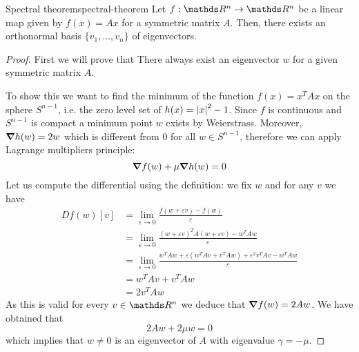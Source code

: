 \documentclass[12pt]{extarticle}
\numberwithin{equation}{subsection}
\begin{document}
\begin{corollary}{Spectral theorem}{spectral-theorem}
	Let $f: \R^n \to \R^n$ be a linear map given by $f(x) = Ax$ for a symmetric matrix $A$.
	Then, there exists an orthonormal basis $\{v_1, \dots, v_n \}$ of eigenvectors.
\end{corollary}
\begin{proof}
	First we will prove that There always exist an eigenvector $w$ for a given symmetric matrix $A$.

	To show this we want to find the minimum of the function $f(x) = x^T A x$ on the sphere $S^{n-1}$,
	i.e. the zero level set of $h(x) = \abs{x}^2 - 1$.
	Since $f$ is continuous and $S^{n-1}$ is compact a minimum point $w$ exists by Weierstrass.
	Moreover, $\grad h(w) = 2w$ which is different from $0$ for all $w \in S^{n-1}$, therefore we can
	apply Lagrange multipliers principle:
	\begin{equation}
		\grad f(w) + \mu \grad h(w) = 0
	\end{equation}
	Let us compute the differential using the definition: we fix $w$ and for any $v$ we have
	\begin{align}
		Df(w)[v] & = \lim_{\varepsilon \to 0} \frac{f(w + \varepsilon v) - f(w)}{\varepsilon}                                                 \\
		         & = \lim_{\varepsilon \to 0} \frac{(w + \varepsilon v)^T A (w + \varepsilon v) - w^T A w}{\varepsilon}                       \\
		         & = \lim_{\varepsilon \to 0} \frac{w^T A w + \varepsilon (w^T A v + v^T A w) + \varepsilon^2 v^T A v - w^T A w}{\varepsilon} \\
		         & = w^T A v + v^T A w                                                                                                        \\
		         & = 2 v^T A w
	\end{align}
	As this is valid for every $v \in \R^n$ we deduce that $\grad f(w) = 2Aw$.
	We have obtained that
	\begin{equation}
		2Aw + 2 \mu w = 0
	\end{equation}
	which implies that $w \neq 0$ is an eigenvector of $A$ with eigenvalue $\gamma = -\mu$.


\end{proof}
\end{document}
